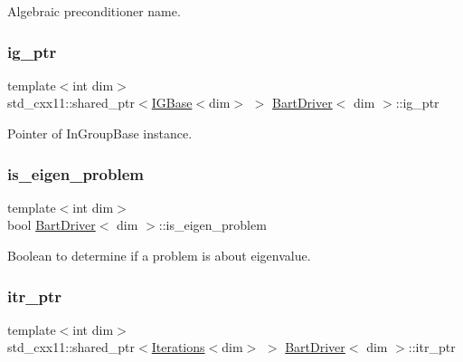 Algebraic preconditioner name. 

\mbox{\label{class_bart_driver_a83323d9561c906f6094a51a5c936cea4}} 
\subsubsection{\texorpdfstring{ig\+\_\+ptr}{ig\_ptr}}
{\footnotesize\ttfamily template$<$int dim$>$ \\
std\+\_\+cxx11\+::shared\+\_\+ptr$<$\hyperlink{class_i_g_base}{I\+G\+Base}$<$dim$>$ $>$ \hyperlink{class_bart_driver}{Bart\+Driver}$<$ dim $>$\+::ig\+\_\+ptr\hspace{0.3cm}{\ttfamily [private]}}



Pointer of In\+Group\+Base instance. 

\mbox{\label{class_bart_driver_a6ee26434a788284182df94da5d71ca12}} 
\subsubsection{\texorpdfstring{is\+\_\+eigen\+\_\+problem}{is\_eigen\_problem}}
{\footnotesize\ttfamily template$<$int dim$>$ \\
bool \hyperlink{class_bart_driver}{Bart\+Driver}$<$ dim $>$\+::is\+\_\+eigen\+\_\+problem\hspace{0.3cm}{\ttfamily [private]}}



Boolean to determine if a problem is about eigenvalue. 

\mbox{\label{class_bart_driver_ae07e7a592dd255d69685f17d98a2ecc6}} 
\subsubsection{\texorpdfstring{itr\+\_\+ptr}{itr\_ptr}}
{\footnotesize\ttfamily template$<$int dim$>$ \\
std\+\_\+cxx11\+::shared\+\_\+ptr$<$\hyperlink{class_iterations}{Iterations}$<$dim$>$ $>$ \hyperlink{class_bart_driver}{Bart\+Driver}$<$ dim $>$\+::itr\+\_\+ptr\hspace{0.3cm}{\ttfamily [private]}}




